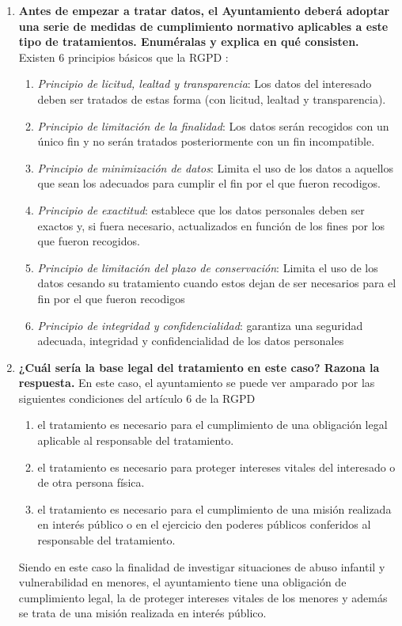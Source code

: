 \documentclass[10pt,a4paper]{article}
\begin{document}
\begin{enumerate}
\item \textbf{Antes de empezar a tratar datos, el Ayuntamiento deberá adoptar una serie de medidas de cumplimiento normativo aplicables a este tipo de tratamientos. Enuméralas y explica en qué consisten.}\\
Existen 6 principios básicos que la RGPD \cite[art. 5]{RGPD}: 
\begin{enumerate}[label=(\alph*)]
\item \textit{Principio de licitud, lealtad y transparencia}: Los datos del interesado deben ser tratados de estas forma (con licitud, lealtad y transparencia).
\item \textit{Principio de limitación de la finalidad}: Los datos serán recogidos con un único fin y no serán tratados posteriormente con un fin incompatible.
\item \textit{Principio de minimización de datos}: Limita el uso de los datos a aquellos que sean los adecuados para cumplir el fin por el que fueron recodigos.
\item \textit{Principio de exactitud}: establece que los datos personales deben ser exactos y, si fuera necesario, actualizados en función de los fines por los que fueron recogidos.
\item \textit{Principio de limitación del plazo de conservación}: Limita el uso de los datos cesando su tratamiento cuando estos dejan de ser necesarios para el fin por el que fueron recodigos
\item \textit{Principio de integridad y confidencialidad}: garantiza una seguridad adecuada, integridad y confidencialidad de los datos personales 
\end{enumerate}

\item \textbf{¿Cuál sería la base legal del tratamiento en este caso? Razona la respuesta.}
En este caso, el ayuntamiento se puede ver amparado por las siguientes condiciones del artículo 6 de la RGPD \cite[art 6.]{RGPD}
\begin{enumerate}[label=(\alph*)]
\item el tratamiento es necesario para el cumplimiento de una obligación legal aplicable al responsable del tratamiento.
\item el tratamiento es necesario para proteger intereses vitales del interesado o de otra persona física.
\item el tratamiento es necesario para el cumplimiento de una misión realizada en interés público o en el ejercicio den poderes públicos conferidos al responsable del tratamiento.
\end{enumerate}
Siendo en este caso la finalidad de investigar situaciones de abuso infantil y vulnerabilidad en menores, el ayuntamiento tiene una obligación de cumplimiento legal, la de proteger intereses vitales de los menores y además se trata de una misión realizada en interés público.


\end{enumerate}
\end{document}
